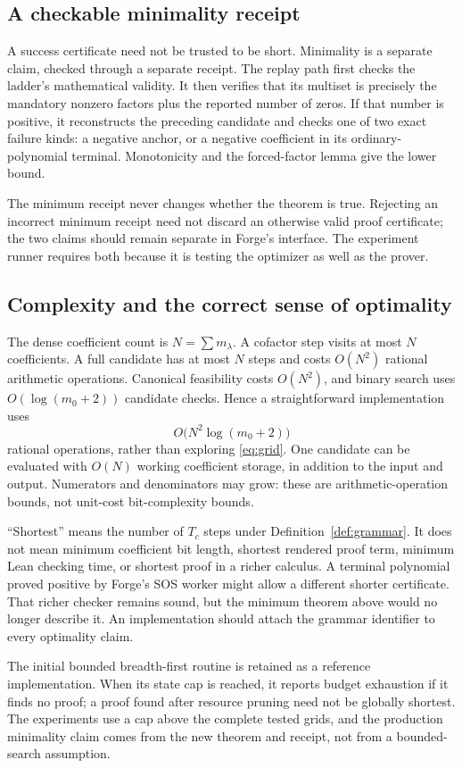 \subsection{A checkable minimality receipt}

A success certificate need not be trusted to be short. Minimality is a separate claim, checked through a separate receipt. The replay path first checks the ladder's mathematical validity. It then verifies that its multiset is precisely the mandatory nonzero factors plus the reported number of zeros. If that number is positive, it reconstructs the preceding candidate and checks one of two exact failure kinds: a negative anchor, or a negative coefficient in its ordinary-polynomial terminal. Monotonicity and the forced-factor lemma give the lower bound.

The minimum receipt never changes whether the theorem is true. Rejecting an incorrect minimum receipt need not discard an otherwise valid proof certificate; the two claims should remain separate in Forge's interface. The experiment runner requires both because it is testing the optimizer as well as the prover.

\subsection{Complexity and the correct sense of optimality}

The dense coefficient count is $N=\sum m_\lambda$. A cofactor step visits at most $N$ coefficients. A full candidate has at most $N$ steps and costs $O(N^2)$ rational arithmetic operations. Canonical feasibility costs $O(N^2)$, and binary search uses $O(\log(m_0+2))$ candidate checks. Hence a straightforward implementation uses
\[
 O\bigl(N^2\log(m_0+2)\bigr)
\]
rational operations, rather than exploring \eqref{eq:grid}. One candidate can be evaluated with $O(N)$ working coefficient storage, in addition to the input and output. Numerators and denominators may grow: these are arithmetic-operation bounds, not unit-cost bit-complexity bounds.

``Shortest'' means the number of $T_c$ steps under Definition~\ref{def:grammar}. It does not mean minimum coefficient bit length, shortest rendered proof term, minimum Lean checking time, or shortest proof in a richer calculus. A terminal polynomial proved positive by Forge's SOS worker might allow a different shorter certificate. That richer checker remains sound, but the minimum theorem above would no longer describe it. An implementation should attach the grammar identifier to every optimality claim.

The initial bounded breadth-first routine is retained as a reference implementation. When its state cap is reached, it reports budget exhaustion if it finds no proof; a proof found after resource pruning need not be globally shortest. The experiments use a cap above the complete tested grids, and the production minimality claim comes from the new theorem and receipt, not from a bounded-search assumption.
